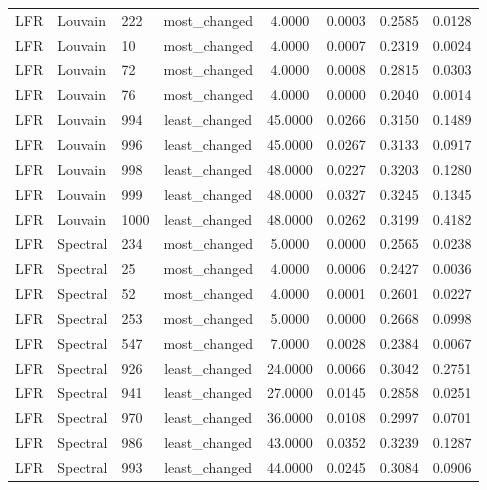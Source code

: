 \begin{longtable}{lllccccc}
LFR & Louvain & 222 & most\_changed & 4.0000 & 0.0003 & 0.2585 & 0.0128 \\
LFR & Louvain & 10 & most\_changed & 4.0000 & 0.0007 & 0.2319 & 0.0024 \\
LFR & Louvain & 72 & most\_changed & 4.0000 & 0.0008 & 0.2815 & 0.0303 \\
LFR & Louvain & 76 & most\_changed & 4.0000 & 0.0000 & 0.2040 & 0.0014 \\
LFR & Louvain & 994 & least\_changed & 45.0000 & 0.0266 & 0.3150 & 0.1489 \\
LFR & Louvain & 996 & least\_changed & 45.0000 & 0.0267 & 0.3133 & 0.0917 \\
LFR & Louvain & 998 & least\_changed & 48.0000 & 0.0227 & 0.3203 & 0.1280 \\
LFR & Louvain & 999 & least\_changed & 48.0000 & 0.0327 & 0.3245 & 0.1345 \\
LFR & Louvain & 1000 & least\_changed & 48.0000 & 0.0262 & 0.3199 & 0.4182 \\
LFR & Spectral & 234 & most\_changed & 5.0000 & 0.0000 & 0.2565 & 0.0238 \\
LFR & Spectral & 25 & most\_changed & 4.0000 & 0.0006 & 0.2427 & 0.0036 \\
LFR & Spectral & 52 & most\_changed & 4.0000 & 0.0001 & 0.2601 & 0.0227 \\
LFR & Spectral & 253 & most\_changed & 5.0000 & 0.0000 & 0.2668 & 0.0998 \\
LFR & Spectral & 547 & most\_changed & 7.0000 & 0.0028 & 0.2384 & 0.0067 \\
LFR & Spectral & 926 & least\_changed & 24.0000 & 0.0066 & 0.3042 & 0.2751 \\
LFR & Spectral & 941 & least\_changed & 27.0000 & 0.0145 & 0.2858 & 0.0251 \\
LFR & Spectral & 970 & least\_changed & 36.0000 & 0.0108 & 0.2997 & 0.0701 \\
LFR & Spectral & 986 & least\_changed & 43.0000 & 0.0352 & 0.3239 & 0.1287 \\
LFR & Spectral & 993 & least\_changed & 44.0000 & 0.0245 & 0.3084 & 0.0906 \\
\end{longtable}